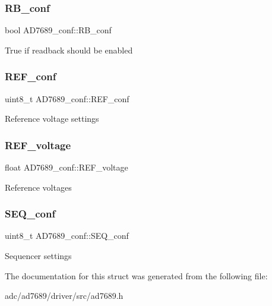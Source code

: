 \subsubsection{\texorpdfstring{R\+B\+\_\+conf}{RB\_conf}}
{\footnotesize\ttfamily bool A\+D7689\+\_\+conf\+::\+R\+B\+\_\+conf}

True if readback should be enabled \mbox{\label{struct_a_d7689__conf_a6432ae4a479a0c7d69a26766ced7236a}} 
\subsubsection{\texorpdfstring{R\+E\+F\+\_\+conf}{REF\_conf}}
{\footnotesize\ttfamily uint8\+\_\+t A\+D7689\+\_\+conf\+::\+R\+E\+F\+\_\+conf}

Reference voltage settings \mbox{\label{struct_a_d7689__conf_afa7cab435f4302f48c7e475ddb500b8b}} 
\subsubsection{\texorpdfstring{R\+E\+F\+\_\+voltage}{REF\_voltage}}
{\footnotesize\ttfamily float A\+D7689\+\_\+conf\+::\+R\+E\+F\+\_\+voltage}

Reference voltages \mbox{\label{struct_a_d7689__conf_ab47a25238b90f905090e1c45a464aae6}} 
\subsubsection{\texorpdfstring{S\+E\+Q\+\_\+conf}{SEQ\_conf}}
{\footnotesize\ttfamily uint8\+\_\+t A\+D7689\+\_\+conf\+::\+S\+E\+Q\+\_\+conf}

Sequencer settings 

The documentation for this struct was generated from the following file\+:\begin{DoxyCompactItemize}
\item 
adc/ad7689/driver/src/ad7689.\+h\end{DoxyCompactItemize}
